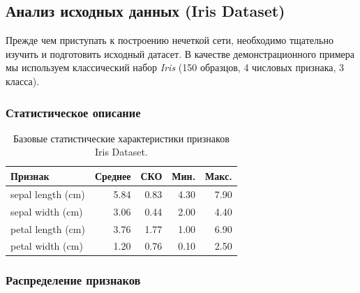 \subsection{Анализ исходных данных (Iris Dataset)}


Прежде чем приступать к построению нечеткой сети, необходимо тщательно изучить и подготовить исходный датасет. В качестве демонстрационного примера мы используем классический набор \emph{Iris} (150 образцов, 4 числовых признака, 3 класса).

\subsubsection{Статистическое описание}
\begin{table}[H]
  \centering
  \caption{Базовые статистические характеристики признаков Iris Dataset.}
  \begin{tabular}{lrrrr}
    \toprule
    Признак & Среднее & СКО & Мин. & Макс. \\
    \midrule
    sepal length (cm) & 5.84 & 0.83 & 4.30 & 7.90 \\
    sepal width  (cm) & 3.06 & 0.44 & 2.00 & 4.40 \\
    petal length (cm) & 3.76 & 1.77 & 1.00 & 6.90 \\
    petal width  (cm) & 1.20 & 0.76 & 0.10 & 2.50 \\
    \bottomrule
  \end{tabular}
  \label{tab:iris_stats}
\end{table}

\subsubsection{Распределение признаков}

